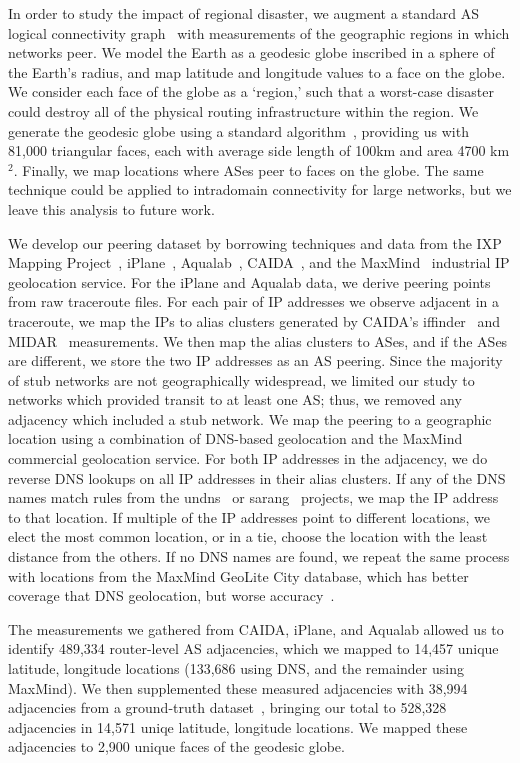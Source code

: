 
In order to study the impact of regional disaster, we augment a standard AS
logical connectivity graph~\cite{caida-asgraph} with measurements of the
geographic regions in which networks peer.  We model the Earth as a geodesic
globe inscribed in a sphere of the Earth's radius, and map latitude and
longitude values to a face on the globe.  We consider each face of the globe as
a `region,' such that a worst-case disaster could destroy all of the physical
routing infrastructure within the region.  We generate the geodesic globe using
a standard algorithm~\cite{geodesic}, providing us with 81,000 triangular
faces, each with average side length of 100km and area 4700 km$^2$.  Finally,
we map locations where ASes peer to faces on the globe.  The same technique
could be applied to intradomain connectivity for large networks, but we leave
this analysis to future work.    

We develop our peering dataset by borrowing techniques and data from the IXP
Mapping Project~\cite{ixps-mapped}, iPlane~\cite{iplane},
Aqualab~\cite{sidewalk}, CAIDA~\cite{caidadata}, and the MaxMind~\cite{maxmind}
industrial IP geolocation service.  For the iPlane and Aqualab data, we derive
peering points from raw traceroute files.  For each pair of IP addresses we
observe adjacent in a traceroute, we map the IPs to alias clusters generated by
CAIDA's iffinder~\cite{iffinder} and MIDAR~\cite{iffinder, midar} measurements.
We then map the alias clusters to ASes, and if the ASes are different, we store
the two IP addresses as an AS peering.  Since the majority of stub networks are
not geographically widespread, we limited our study to networks which provided
transit to at least one AS; thus, we removed any adjacency which included a
stub network.  We map the peering to a geographic location using a combination
of DNS-based geolocation and the MaxMind commercial geolocation service.  For
both IP addresses in the adjacency, we do reverse DNS lookups on all IP
addresses in their alias clusters.  If any of the DNS names match rules from
the undns~\cite{undns} or sarang~\cite{sarang} projects, we map the IP address
to that location.  If multiple of the IP addresses point to different
locations, we elect the most common location, or in a tie, choose the location
with the least distance from the others.  If no DNS names are found, we repeat
the same process with locations from the MaxMind GeoLite City database, which
has better coverage that DNS geolocation, but worse
accuracy~\cite{uhlig_ccr_paper}. 

The measurements we gathered from CAIDA, iPlane, and Aqualab allowed us to
identify 489,334 router-level AS adjacencies, which we mapped to 14,457 unique
latitude, longitude locations (133,686 using DNS, and the remainder using
MaxMind).  We then supplemented these measured adjacencies with 38,994
adjacencies from a ground-truth dataset~\cite{ixps-mapped}, bringing our total
to 528,328 adjacencies in 14,571 uniqe latitude, longitude locations.  We
mapped these adjacencies to 2,900 unique faces of the geodesic globe.   

